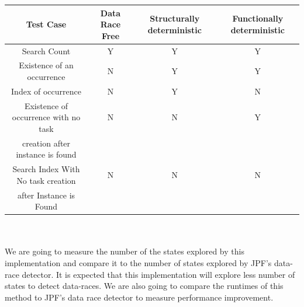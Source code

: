 \begin{enumerate}
\begin{tabular}{ | c | c | c | c |}
  \hline
  \textbf{Test Case} & \textbf{Data Race Free} & \textbf{Structurally deterministic} & \textbf{Functionally deterministic} \\
  \hline
  Search Count & Y & Y & Y \\
  \hline
  Existence of an occurrence & N & Y & Y \\
  \hline
  Index of occurrence & N & Y & N\\
  \hline
  Existence of occurrence with no task  & N & N & Y\\
  creation after instance is found & & & \\
  \hline
  Search Index With No task creation & N & N & N\\
   after Instance is Found  & & & \\
  \hline 
\end{tabular}
\\
\\
We are going to measure the number of the states explored by this implementation and compare it to the number of states explored by JPF's data-race detector. It is expected that this implementation will explore less number of states to detect data-races. We are also going to compare the runtimes of this method to JPF's data race detector to measure performance improvement.

\end{enumerate}